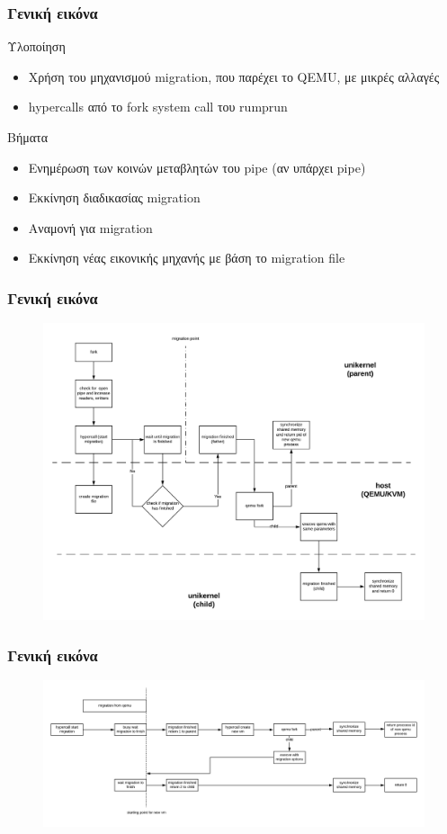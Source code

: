 \documentclass[red,slidestop,notes,compress,mathserif]{beamer}
\begin{document}
\begin{frame}
\frametitle{Γενική εικόνα}
\begin{block}{Υλοποίηση}
\begin{itemize}
\item Χρήση του μηχανισμού migration, που παρέχει το QEMU, με μικρές αλλαγές
\item hypercalls από το fork system call του rumprun
\end{itemize}
\end{block}
\begin{block}{Βήματα}
\begin{itemize}
\item Ενημέρωση των κοινών μεταβλητών του pipe (αν υπάρχει pipe)
\item Εκκίνηση διαδικασίας migration
\item Αναμονή για migration
\item Εκκίνηση νέας εικονικής μηχανής με βάση το migration file
\end{itemize}
\end{block}
\end{frame}

\begin{frame}
\frametitle{Γενική εικόνα}
\begin{figure}
\center
\includegraphics[scale=0.4]{figures/fork_olo.png}
\end{figure}
\end{frame}

\begin{frame}
\frametitle{Γενική εικόνα}
\begin{figure}
\center
\includegraphics[scale=0.4]{figures/fork_timeline.png}
\end{figure}
\end{frame}
\end{document}
